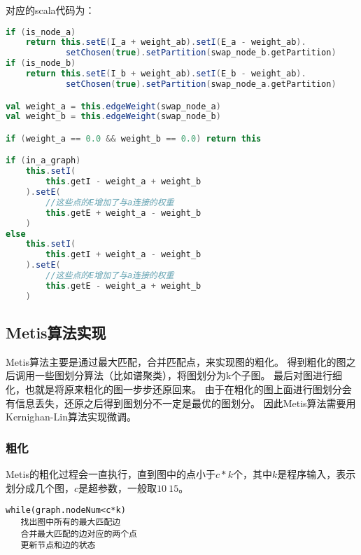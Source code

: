 
对应的scala代码为：

\begin{lstlisting}[language=Scala]
if (is_node_a)
    return this.setE(I_a + weight_ab).setI(E_a - weight_ab).
            setChosen(true).setPartition(swap_node_b.getPartition)
if (is_node_b)
    return this.setE(I_b + weight_ab).setI(E_b - weight_ab).
            setChosen(true).setPartition(swap_node_a.getPartition)

val weight_a = this.edgeWeight(swap_node_a)
val weight_b = this.edgeWeight(swap_node_b)

if (weight_a == 0.0 && weight_b == 0.0) return this

if (in_a_graph)
    this.setI(
        this.getI - weight_a + weight_b
    ).setE(
        //这些点的E增加了与a连接的权重
        this.getE + weight_a - weight_b
    )
else
    this.setI(
        this.getI + weight_a - weight_b
    ).setE(
        //这些点的E增加了与a连接的权重
        this.getE - weight_a + weight_b
    )
\end{lstlisting}

\subsection{Metis算法实现}

Metis算法主要是通过最大匹配，合并匹配点，来实现图的粗化。
得到粗化的图之后调用一些图划分算法（比如谱聚类），将图划分为k个子图。
最后对图进行细化，也就是将原来粗化的图一步步还原回来。
由于在粗化的图上面进行图划分会有信息丢失，还原之后得到图划分不一定是最优的图划分。
因此Metis算法需要用Kernighan-Lin算法实现微调。

\subsubsection{粗化}

Metis的粗化过程会一直执行，直到图中的点小于$c*k$个，其中$k$是程序输入，表示划分成几个图，$c$是超参数，一般取$10~15$。

\begin{lstlisting}
while(graph.nodeNum<c*k)
   找出图中所有的最大匹配边
   合并最大匹配的边对应的两个点
   更新节点和边的状态
\end{lstlisting}

